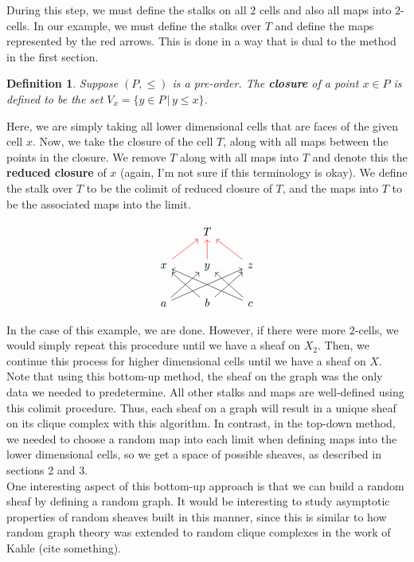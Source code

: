 \documentclass{article}
\newcommand{\clr}{\color{red}}
\newtheorem{definition}{Definition}
\theoremstyle{definition}
\begin{document}
During this step, we must define the stalks on all $2$ cells and also all maps into $2$-cells. In our example, we must define the stalks over $T$ and define the maps represented by the red arrows. This is done in a way that is dual to the method in the first section. 

\begin{definition} Suppose $(P, \leq)$ is a pre-order. The \textbf{closure} of a point $x \in P$ is defined to be the set $V_x = \{y \in P \, | \, y \leq x\}$.
\end{definition}

Here, we are simply taking all lower dimensional cells that are faces of the given cell $x$. Now, we take the closure of the cell $T$, along with all maps between the points in the closure. We remove $T$ along with all maps into $T$ and denote this the \textbf{reduced closure} of $x$ ({\clr again, I'm not sure if this terminology is okay}). We define the stalk over $T$ to be the colimit of reduced closure of $T$, and the maps into $T$ to be the associated maps into the limit.

\[
\begin{tikzcd}
	& T & \\
	x \arrow[red	]{ur} & y \arrow[red]{u} & z \arrow[red]{ul} \\
	a \arrow{ur} \arrow{urr} & b \arrow{ur} \arrow{ul} & c \arrow{ul} \arrow{ull}
\end{tikzcd}	
\]

In the case of this example, we are done. However, if there were more $2$-cells, we would simply repeat this procedure until we have a sheaf on $X_2$. Then, we continue this process for higher dimensional cells until we have a sheaf on $X$. \\

Note that using this bottom-up method, the sheaf on the graph was the only data we needed to predetermine. All other stalks and maps are well-defined using this colimit procedure. Thus, each sheaf on a graph will result in a unique sheaf on its clique complex with this algorithm. In contrast, in the top-down method, we needed to choose a random map into each limit when defining maps into the lower dimensional cells, so we get a space of possible sheaves, as described in sections 2 and 3. \\

One interesting aspect of this bottom-up approach is that we can build a random sheaf by defining a random graph. It would be interesting to study asymptotic properties of random sheaves built in this manner, since this is similar to how random graph theory was extended to random clique complexes in the work of Kahle ({\clr cite something}). 
\end{document}
